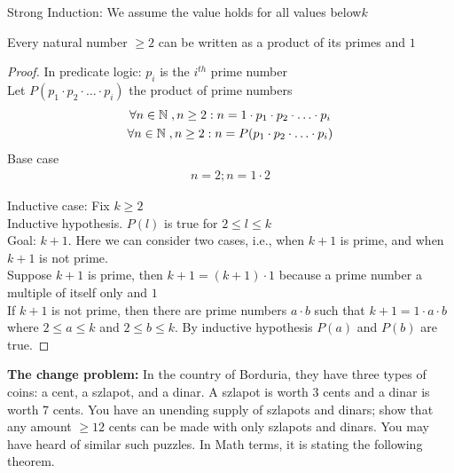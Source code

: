 \documentclass[11pt]{article}
\begin{document}

\section*{}
\begin{definition}
    Strong Induction: We assume the value holds for all values below$k$
\end{definition}

\begin{theorem}
    Every natural number $\geq 2$ can be written as a product of its primes and $1$
\end{theorem}
\begin{proof}
    In predicate logic: $p_i$ is the $i^{th}$ prime number \\
    Let $P(p_1 \cdot p_2 \cdot \ldots \cdot p_i)$ the product of prime numbers
    \begin{gather}
        \forall n \in \mathbb{N}\hspace{1.0mm}, n \geq 2: n = 1 \cdot p_1 \cdot p_2 \cdot \ldots \cdot p_i \\
        \forall n \in \mathbb{N}\hspace{1.0mm}, n \geq 2: n = P(p_1 \cdot p_2 \cdot \ldots \cdot p_i)
    \end{gather}
    Base case
    \begin{gather}
        n = 2; n = 1 \cdot 2
    \end{gather}

    Inductive case: Fix $k \geq 2$ \\
    Inductive hypothesis. $P(l)$ is true for $2 \leq l \leq k$ \\
    Goal: $k+1$. Here we can consider two cases, i.e., when $k+1$ is prime, and when $k+1$ is not prime. \\

    Suppose $k+1$ is prime, then $k+1 = (k+1) \cdot 1$ because a prime number a multiple of itself only and $1$ \\

    If $k+1$ is not prime, then there are prime numbers $a \cdot b$ such that $k+1 = 1 \cdot a \cdot b$ where $2 \leq a \leq k$ and $2 \leq b \leq k$. By inductive hypothesis $P(a)$ and $P(b)$ are true.
\end{proof}

\textbf{The change problem: } In the country of Borduria, they have three types of coins: a cent, a szlapot,
and a dinar. A szlapot is worth 3 cents and a dinar is worth 7 cents. You have an unending supply of szlapots and dinars; show that any amount $\geq 12$ cents can be made with only szlapots and dinars. You may have heard of similar such puzzles. In Math terms, it is stating the following theorem.
\end{document}
